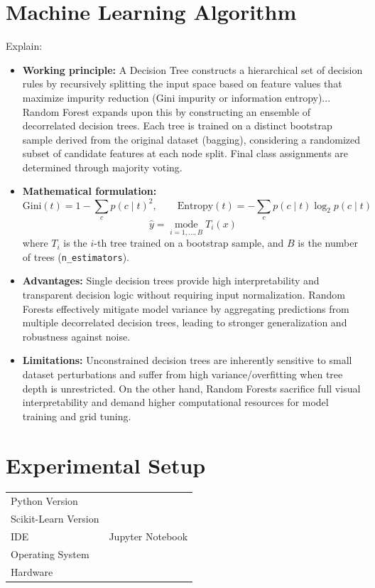\documentclass[12pt,a4paper]{article}
\begin{document}
\section{Machine Learning Algorithm}
Explain:
\begin{itemize}
\item \textbf{Working principle:} A Decision Tree constructs a hierarchical set of decision rules by recursively splitting the input space based on feature values that maximize impurity reduction (Gini impurity or information entropy)... Random Forest expands upon this by constructing an ensemble of decorrelated decision trees. Each tree is trained on a distinct bootstrap sample derived from the original dataset (bagging), considering a randomized subset of candidate features at each node split. Final class assignments are determined through majority voting.
\item \textbf{Mathematical formulation:}
$$\text{Gini}(t) = 1 - \sum_{c} p(c\mid t)^2, \qquad
\text{Entropy}(t) = -\sum_{c} p(c\mid t)\log_2 p(c\mid t)$$
$$\hat{y} = \operatorname*{mode}_{i=1,\dots,B} T_i(x)$$
where $T_i$ is the $i$-th tree trained on a bootstrap sample, and $B$ is the number of trees
(\texttt{n\_estimators}).
\item \textbf{Advantages:} Single decision trees provide high interpretability and transparent decision logic without requiring input normalization. Random Forests effectively mitigate model variance by aggregating predictions from multiple decorrelated decision trees, leading to stronger generalization and robustness against noise.
\item \textbf{Limitations:} Unconstrained decision trees are inherently sensitive to small dataset perturbations and suffer from high variance/overfitting when tree depth is unrestricted. On the other hand, Random Forests sacrifice full visual interpretability and demand higher computational resources for model training and grid tuning.
\end{itemize}

\section{Experimental Setup}
\begin{tabular}{ll}
\toprule
Python Version & \\
Scikit-Learn Version & \\
IDE & Jupyter Notebook \\
Operating System & \\
Hardware & \\
\bottomrule
\end{tabular}
\end{document}
